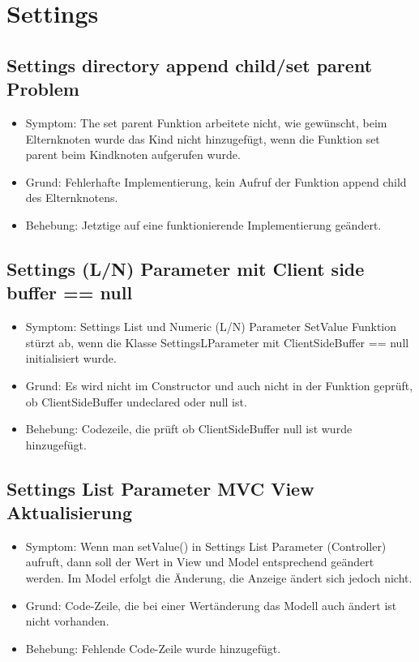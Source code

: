 \documentclass[qualitaetssicherung.tex]{subfiles}
\begin{document}
\section{Settings}

	\subsection{Settings directory append child/set parent Problem}
		\begin{itemize}
			\item
			Symptom: The set parent Funktion arbeitete nicht, wie gewünscht, beim Elternknoten wurde das Kind nicht hinzugefügt, wenn die Funktion set parent beim Kindknoten aufgerufen wurde. 
			\item
			Grund: Fehlerhafte Implementierung, kein Aufruf der Funktion append child des Elternknotens.
			\item
			Behebung: Jetztige auf eine funktionierende Implementierung geändert.
		\end{itemize}
	
	\subsection{Settings (L/N) Parameter mit Client side buffer == null}
		\begin{itemize}
			\item
			Symptom: Settings List und Numeric (L/N) Parameter SetValue Funktion stürzt ab, wenn die Klasse SettingsLParameter mit ClientSideBuffer == null initialisiert wurde.
			\item
			Grund: Es wird nicht im Constructor und auch nicht in der Funktion geprüft, ob ClientSideBuffer undeclared oder null ist.
			\item
			Behebung: Codezeile, die prüft ob ClientSideBuffer null ist wurde hinzugefügt.
		\end{itemize}
	
	\subsection{Settings List Parameter MVC View Aktualisierung}
		\begin{itemize}
			\item
			Symptom: Wenn man setValue() in Settings List Parameter (Controller) aufruft, dann soll der Wert in View und Model entsprechend geändert werden. Im Model erfolgt die Änderung, die Anzeige ändert sich jedoch nicht.
			\item
			Grund: Code-Zeile, die bei einer Wertänderung das Modell auch ändert ist nicht vorhanden.
			\item
			Behebung: Fehlende Code-Zeile wurde hinzugefügt.
		\end{itemize}
		
\end{document}
